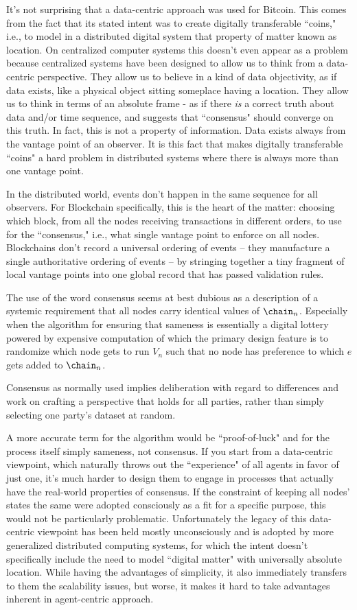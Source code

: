 \documentclass[twocolumn,showpacs,%
  nofootinbib,aps,superscriptaddress,%
  eqsecnum,prd,notitlepage,showkeys,10pt]{revtex4-1}
\begin{document}
It's not surprising that a data-centric approach was used for Bitcoin.  This comes from the fact that its stated intent was to create digitally transferable ``coins," i.e., to model in a distributed digital system that property of matter known as location. On centralized computer systems this doesn't even appear as a problem because centralized systems have been designed to allow us to think from a data-centric perspective.  They allow us to believe in a kind of data objectivity, as if data exists, like a physical object sitting someplace having a location. They allow us to think in terms of an absolute frame - as if there \textit{is} a correct truth about data and/or time sequence, and suggests that ``consensus" should converge on this truth. In fact, this is not a property of information.  Data exists always from the vantage point of an observer.  It is this fact that makes digitally transferable ``coins" a hard problem in distributed systems where there is always more than one vantage point.

In the distributed world, events don't happen in the same sequence for all observers.  For Blockchain specifically, this is the heart of the matter: choosing which block, from all the nodes receiving transactions in different orders, to use for the ``consensus," i.e., what single vantage point to enforce on all nodes.  Blockchains don't record a universal ordering of events -- they manufacture a single authoritative ordering of events -- by stringing together a tiny fragment of local vantage points into one global record that has passed validation rules.

The use of the word consensus seems at best dubious as a description of a systemic requirement that all nodes carry identical values of $\chain_n$.  Especially when the algorithm for ensuring that sameness is essentially a digital lottery powered by expensive computation of which the primary design feature is to randomize which node gets to run $V_n$ such that no node has preference to which $e$ gets added to $\chain_n$.

Consensus as normally used implies deliberation with regard to differences and work on crafting a perspective that holds for all parties, rather than simply selecting one party's dataset at random.

A more accurate term for the algorithm would be ``proof-of-luck" and for the process itself simply sameness, not consensus.  If you start from a data-centric viewpoint, which naturally throws out the ``experience" of all agents in favor of just one, it's much harder to design them to engage in processes that actually have the real-world properties of consensus. If the constraint of keeping all nodes' states the same were adopted consciously as a fit for a specific purpose, this would not be particularly problematic.  Unfortunately the legacy of this data-centric viewpoint has been held mostly unconsciously and is adopted by more generalized distributed computing systems, for which the intent doesn't specifically include the need to model ``digital matter" with universally absolute location.  While having the advantages of simplicity, it also immediately transfers to them the scalability issues, but worse, it makes it hard to take advantages inherent in agent-centric approach.
\end{document}
